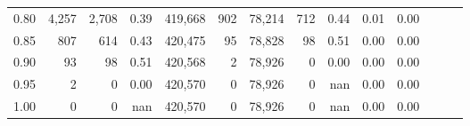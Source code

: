 \begin{tabular}{rrrrrrrrrrrrrr}
0.80 &   4,257 &   2,708 &  0.39 &  419,668 &      902 &  78,214 &     712 &  0.44 &  0.01 &      0.00 \\
0.85 &     807 &     614 &  0.43 &  420,475 &       95 &  78,828 &      98 &  0.51 &  0.00 &      0.00 \\
0.90 &      93 &      98 &  0.51 &  420,568 &        2 &  78,926 &       0 &  0.00 &  0.00 &      0.00 \\
0.95 &       2 &       0 &  0.00 &  420,570 &        0 &  78,926 &       0 &   nan &  0.00 &      0.00 \\
1.00 &       0 &       0 &   nan &  420,570 &        0 &  78,926 &       0 &   nan &  0.00 &      0.00 \\
\bottomrule
\end{tabular}
